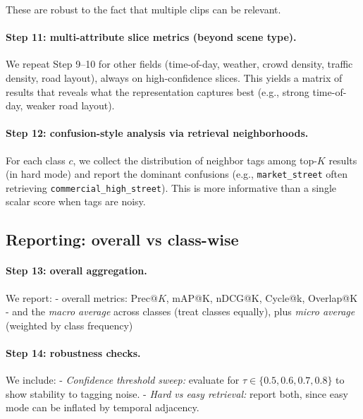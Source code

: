 These are robust to the fact that multiple clips can be relevant.

\paragraph{Step 11: multi-attribute slice metrics (beyond scene type).}
We repeat Step 9--10 for other fields (time-of-day, weather, crowd density, traffic density, road layout), always on high-confidence slices. This yields a matrix of results that reveals what the representation captures best (e.g., strong time-of-day, weaker road layout).

\paragraph{Step 12: confusion-style analysis via retrieval neighborhoods.}
For each class $c$, we collect the distribution of neighbor tags among top-$K$ results (in hard mode) and report the dominant confusions (e.g., \texttt{market\_street} often retrieving \texttt{commercial\_high\_street}). This is more informative than a single scalar score when tags are noisy.

\subsection{Reporting: overall vs class-wise}\label{sec:vjepa_eval_reporting}

\paragraph{Step 13: overall aggregation.}
We report:
- overall metrics: $\text{Prec@}K$, mAP@K, nDCG@K, Cycle@k, Overlap@K
- and the \emph{macro average} across classes (treat classes equally), plus \emph{micro average} (weighted by class frequency)

\paragraph{Step 14: robustness checks.}
We include:
- \emph{Confidence threshold sweep:} evaluate for $\tau \in \{0.5,0.6,0.7,0.8\}$ to show stability to tagging noise.
- \emph{Hard vs easy retrieval:} report both, since easy mode can be inflated by temporal adjacency.

